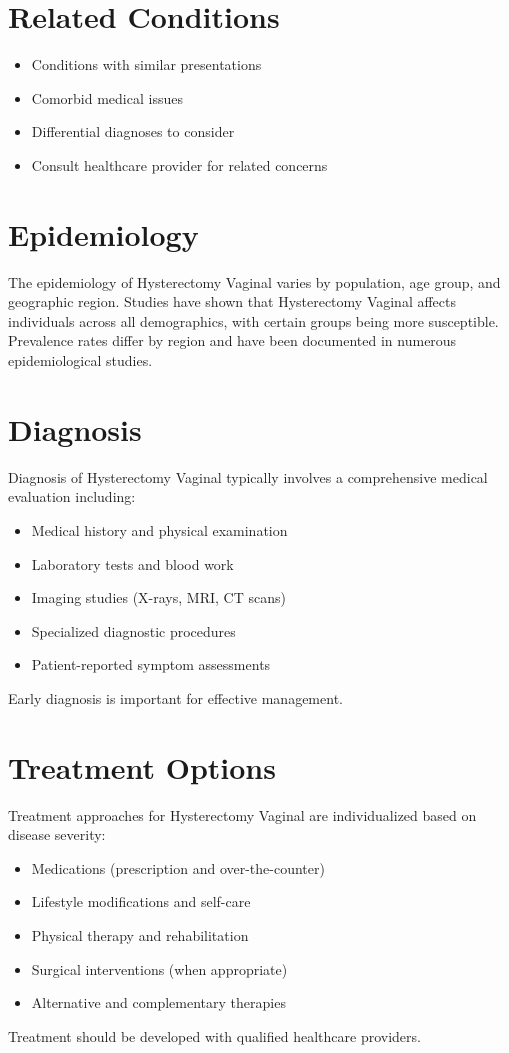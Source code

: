 \section*{Related Conditions}
\begin{itemize}
  \item Conditions with similar presentations
  \item Comorbid medical issues
  \item Differential diagnoses to consider
  \item Consult healthcare provider for related concerns
\end{itemize}

\section*{Epidemiology}
The epidemiology of Hysterectomy Vaginal varies by population, age group, and geographic region. Studies have shown that Hysterectomy Vaginal affects individuals across all demographics, with certain groups being more susceptible. Prevalence rates differ by region and have been documented in numerous epidemiological studies.

\section*{Diagnosis}
Diagnosis of Hysterectomy Vaginal typically involves a comprehensive medical evaluation including:
\begin{itemize}
  \item Medical history and physical examination
  \item Laboratory tests and blood work
  \item Imaging studies (X-rays, MRI, CT scans)
  \item Specialized diagnostic procedures
  \item Patient-reported symptom assessments
\end{itemize}
Early diagnosis is important for effective management.

\section*{Treatment Options}
Treatment approaches for Hysterectomy Vaginal are individualized based on disease severity:
\begin{itemize}
  \item Medications (prescription and over-the-counter)
  \item Lifestyle modifications and self-care
  \item Physical therapy and rehabilitation
  \item Surgical interventions (when appropriate)
  \item Alternative and complementary therapies
\end{itemize}
Treatment should be developed with qualified healthcare providers.


